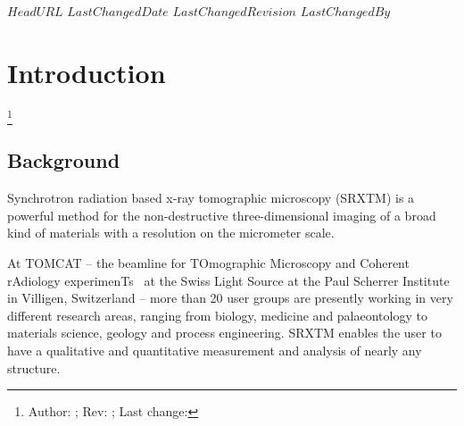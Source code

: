 \svnidlong
{$HeadURL$}
{$LastChangedDate$}
{$LastChangedRevision$}
{$LastChangedBy$}
\section{Introduction}
\footnote{Author: \svnauthor; Rev: \svnrev; Last change: \svndate}%
\subsection{Background}
Synchrotron radiation based x-ray tomographic microscopy (SRXTM) is a powerful method for the non-destructive three-dimensional imaging of a broad kind of materials with a resolution on the micrometer scale.

At TOMCAT -- the beamline for TOmographic Microscopy and Coherent rAdiology experimenTs~\cite{Stampanoni2007} at the Swiss Light Source at the Paul Scherrer Institute in Villigen, Switzerland -- more than 20 user groups are presently working in very different research areas, ranging from biology, medicine and palaeontology to materials science, geology and process engineering. SRXTM enables the user to have a qualitative and quantitative measurement and analysis of nearly any structure.
